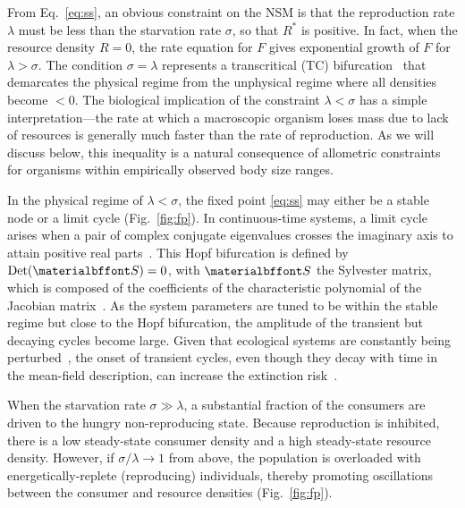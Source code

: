 \documentclass{pnastwo}
\begin{document}
\begin{article}
From Eq.~\eqref{eq:ss}, an obvious constraint on the NSM is that the reproduction rate $\lambda$ must be less than the starvation rate $\sigma$, so that $R^*$ is positive.  In fact, when the resource density $R=0$, the rate equation for $F$ gives exponential growth of $F$ for $\lambda>\sigma$.
The condition $\sigma = \lambda$ represents a transcritical (TC) bifurcation~\cite{Strogatz:2008wo} that demarcates the physical regime from the unphysical regime where all densities become $<0$.
The biological implication of the constraint $\lambda<\sigma$ has a simple interpretation---the rate at which a macroscopic organism loses mass due to lack of resources is generally much faster than the rate of reproduction.
As we will discuss below, this inequality is a natural consequence of allometric constraints~\cite{Kempes:2012hy} for organisms within empirically observed body size ranges. %

In the physical regime of $\lambda<\sigma$, the fixed point \eqref{eq:ss} may either be a stable node or a limit cycle (Fig.~\ref{fig:fp}).
In continuous-time systems, a limit cycle arises when a pair of complex conjugate eigenvalues crosses the imaginary axis to attain positive real parts~\cite{GuckHolmes}.
This Hopf bifurcation is defined by ${\rm Det}({\bf S}) = 0$, with $\bf S$ the Sylvester matrix, which is composed of the coefficients of the characteristic polynomial of the Jacobian matrix~\cite{Gross:2004p2428}.
As the system parameters are tuned to be within the stable regime but close to the Hopf bifurcation, the amplitude of the transient but decaying cycles become large.
Given that ecological systems are constantly being perturbed~\cite{Hastings:2001jh}, the onset of transient cycles, even though they decay with time in the mean-field description, can increase the extinction risk~\cite{Neubert:1997wk,Caswell:2005eo,Neubert:2009td}.

When the starvation rate $\sigma\gg\lambda$, a substantial fraction of the consumers are driven to the hungry non-reproducing state.
Because reproduction is inhibited, there is a low steady-state consumer density and a high steady-state resource density.
However, if $\sigma/\lambda\to 1$ from above, the population is overloaded with energetically-replete (reproducing) individuals, thereby promoting oscillations between the consumer and resource densities (Fig.~\ref{fig:fp}).


\end{article}
\end{document}
